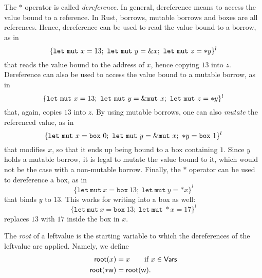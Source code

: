 The $*$ operator is called \emph{dereference}. In general, dereference means to access the
value bound to a reference. In Rust, borrows, mutable borrows and boxes are all references.
Hence, dereference can be used to read the value bound to a borrow, as in
\[
\{
\mathtt{let\ mut}\ x = 13;\
\mathtt{let\ mut}\ y = \& x;\
\mathtt{let\ mut}\ z = \mathtt{*}y
\}^l
\]
that reads the value bound to the address of $x$, hence copying $13$ into $z$.
Dereference can also be used to access the value bound to a mutable borrow, as in
\[
\{
\mathtt{let\ mut}\ x = 13;\
\mathtt{let\ mut}\ y = \&\mathtt{mut}\  x;\
\mathtt{let\ mut}\ z = \mathtt{*}y
\}^l
\]
that, again, copies $13$ into $z$.
By using mutable borrows, one can also \emph{mutate} the referenced value, as in
\[
\{
\mathtt{let\ mut}\ x = \mathtt{box}\ 0;\
\mathtt{let\ mut}\ y = \&\mathtt{mut}\  x;\
\mathtt{*}y = \mathtt{box}\ 1
\}^l
\]
that modifies $x$, so that it ends up being bound to a box containing $1$. Since $y$ holds a mutable borrow,
it is legal to mutate the value bound to it, which would not be the case with a non-mutable borrow.
Finally, the $*$ operator can be used to dereference a box, as in
\[
\{
\mathtt{let\ mut}\ x = \mathtt{box}\ 13;\
\mathtt{let\ mut}\ y = *x
\}^l
\]
that binds $y$ to $13$. This works for writing into a box as well:
\[
\{
\mathtt{let\ mut}\ x = \mathtt{box}\ 13;\
\mathtt{let\ mut}\ *x = 17
\}^l
\]
replaces $13$ with $17$ inside the box in $x$.

\begin{definition}\label{def:root}
  The \emph{root} of a leftvalue is the starting variable to which the dereferences of the
  leftvalue are applied. Namely, we define
  \begin{align*}
    \mathsf{root}(x) &= x\qquad\text{if $x\in\mathsf{Vars}$}\\
    \mathsf{root}(\mathtt{*}\mathsf{w}) &= \mathsf{root}(\mathsf{w}).
  \end{align*}
\end{definition}

